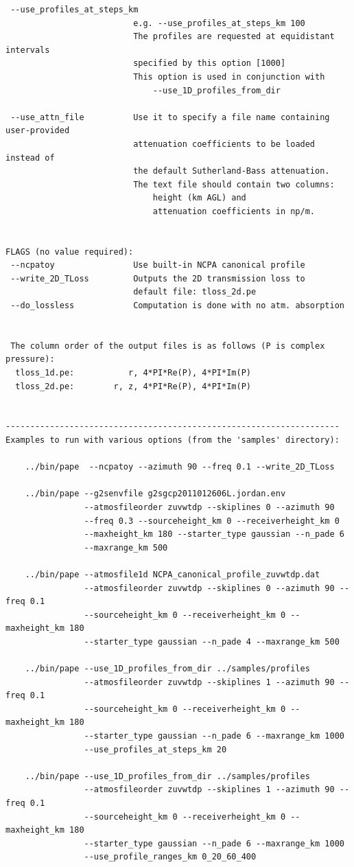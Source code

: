 \begin{verbatim}
 --use_profiles_at_steps_km
                          e.g. --use_profiles_at_steps_km 100
                          The profiles are requested at equidistant intervals 
                          specified by this option [1000]
                          This option is used in conjunction with
                              --use_1D_profiles_from_dir

 --use_attn_file          Use it to specify a file name containing user-provided
                          attenuation coefficients to be loaded instead of 
                          the default Sutherland-Bass attenuation. 
                          The text file should contain two columns: 
                              height (km AGL) and 
                              attenuation coefficients in np/m.


FLAGS (no value required):
 --ncpatoy                Use built-in NCPA canonical profile
 --write_2D_TLoss         Outputs the 2D transmission loss to
                          default file: tloss_2d.pe
 --do_lossless            Computation is done with no atm. absorption


 The column order of the output files is as follows (P is complex pressure):
  tloss_1d.pe:           r, 4*PI*Re(P), 4*PI*Im(P)
  tloss_2d.pe:        r, z, 4*PI*Re(P), 4*PI*Im(P)


--------------------------------------------------------------------
Examples to run with various options (from the 'samples' directory):

    ../bin/pape  --ncpatoy --azimuth 90 --freq 0.1 --write_2D_TLoss

    ../bin/pape --g2senvfile g2sgcp2011012606L.jordan.env 
                --atmosfileorder zuvwtdp --skiplines 0 --azimuth 90 
                --freq 0.3 --sourceheight_km 0 --receiverheight_km 0 
                --maxheight_km 180 --starter_type gaussian --n_pade 6 
                --maxrange_km 500

    ../bin/pape --atmosfile1d NCPA_canonical_profile_zuvwtdp.dat 
                --atmosfileorder zuvwtdp --skiplines 0 --azimuth 90 --freq 0.1 
                --sourceheight_km 0 --receiverheight_km 0 --maxheight_km 180 
                --starter_type gaussian --n_pade 4 --maxrange_km 500

    ../bin/pape --use_1D_profiles_from_dir ../samples/profiles 
                --atmosfileorder zuvwtdp --skiplines 1 --azimuth 90 --freq 0.1 
                --sourceheight_km 0 --receiverheight_km 0 --maxheight_km 180
                --starter_type gaussian --n_pade 6 --maxrange_km 1000  
                --use_profiles_at_steps_km 20

    ../bin/pape --use_1D_profiles_from_dir ../samples/profiles 
                --atmosfileorder zuvwtdp --skiplines 1 --azimuth 90 --freq 0.1 
                --sourceheight_km 0 --receiverheight_km 0 --maxheight_km 180 
                --starter_type gaussian --n_pade 6 --maxrange_km 1000  
                --use_profile_ranges_km 0_20_60_400
\end{verbatim}


